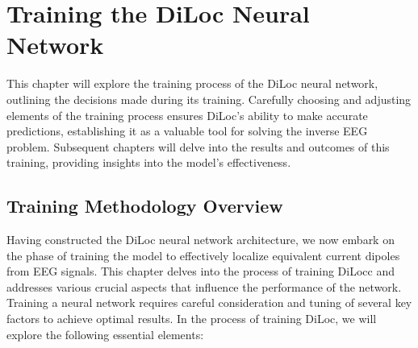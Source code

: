 \documentclass[a4paper, UKenglish, 11pt]{uiomaster}
\begin{document}
\chapter{Training the DiLoc Neural Network}
This chapter will explore the training process of the DiLoc neural network, outlining the decisions made during its training. Carefully choosing and adjusting elements of the training process ensures DiLoc's ability to make accurate predictions, establishing it as a valuable tool for solving the inverse EEG problem. Subsequent chapters will delve into the results and outcomes of this training, providing insights into the model's effectiveness.

\section{Training Methodology Overview}
Having constructed the DiLoc neural network architecture, we now embark on the phase of training the model to effectively localize equivalent current dipoles from EEG signals. This chapter delves into the process of training DiLocc and addresses various crucial aspects that influence the performance of the network. Training a neural network requires careful consideration and tuning of several key factors to achieve optimal results. In the process of training DiLoc, we will explore the following essential elements:
\end{document}
